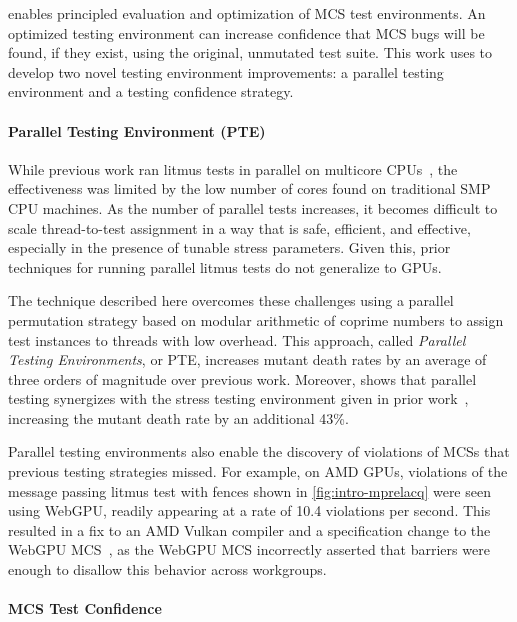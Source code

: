 \sys enables principled evaluation and optimization of MCS test environments. An optimized testing environment can increase confidence that MCS bugs will be found, if they exist, using the original, unmutated test suite. This work uses \sys to develop two novel testing environment improvements: a parallel testing environment and a testing confidence strategy.

\paragraph{Parallel Testing Environment (PTE)}
While previous work ran litmus tests in parallel on multicore CPUs~\cite{alglave2011litmus}, the effectiveness was limited by the low number of cores found on traditional SMP CPU machines.
As the number of parallel tests increases, it becomes difficult to scale thread-to-test assignment in a way that is safe, efficient, and effective, especially in the presence of tunable stress parameters. Given this, prior techniques for running parallel litmus tests do not generalize to GPUs.

The technique described here overcomes these challenges using a parallel permutation strategy based on modular arithmetic of coprime numbers to assign test instances to threads with low overhead.
This approach, called \textit{Parallel Testing Environments}, or PTE, increases mutant death rates by an average of three orders of magnitude over previous work. Moreover, \sys shows that parallel testing synergizes with the stress testing environment given in prior work~\cite{kirkham2020foundations}, increasing the mutant death rate by an additional 43\%.

Parallel testing environments also enable the discovery of violations of MCSs that previous testing strategies missed. For example, on AMD GPUs, violations of the message passing litmus test with fences shown in \myfig\ref{fig:intro-mprelacq} were seen using WebGPU, readily appearing at a rate of 10.4 violations per second. This resulted in a fix to an AMD Vulkan compiler and a specification change to the WebGPU MCS~\cite{webgpu-spec-change}, as the WebGPU MCS incorrectly asserted that barriers were enough to disallow this behavior across workgroups.

\paragraph{MCS Test Confidence}

